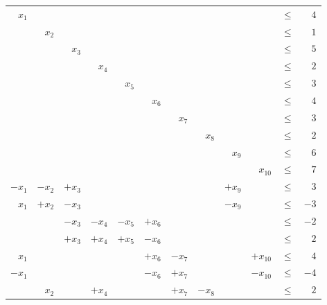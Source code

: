 \documentclass[11pt,a4paper,english]{article}
\begin{document}
\begin{table}[H]
   \begin{tabular}{rrrrrrrrrrrr}
   $x_1$  & ~      & ~      & ~      & ~      & ~      & ~      & ~      & ~      & ~         & $\leq$ & $4$  \\
   ~      & $x_2$  & ~      & ~      & ~      & ~      & ~      & ~      & ~      & ~         & $\leq$ & $1$  \\
   ~      & ~      & $x_3$  & ~      & ~      & ~      & ~      & ~      & ~      & ~         & $\leq$ & $5$  \\
   ~      & ~      & ~      & $x_4$  & ~      & ~      & ~      & ~      & ~      & ~         & $\leq$ & $2$  \\
   ~      & ~      & ~      & ~      & $x_5$  & ~      & ~      & ~      & ~      & ~         & $\leq$ & $3$  \\
   ~      & ~      & ~      & ~      & ~      & $x_6$  & ~      & ~      & ~      & ~         & $\leq$ & $4$  \\
   ~      & ~      & ~      & ~      & ~      & ~      & $x_7$  & ~      & ~      & ~         & $\leq$ & $3$  \\
   ~      & ~      & ~      & ~      & ~      & ~      & ~      & $x_8$  & ~      & ~         & $\leq$ & $2$  \\
   ~      & ~      & ~      & ~      & ~      & ~      & ~      & ~      & $x_9$  & ~         & $\leq$ & $6$  \\
   ~      & ~      & ~      & ~      & ~      & ~      & ~      & ~      & ~      & $x_{10}$  & $\leq$ & $7$  \\
   $-x_1$ & $-x_2$ & $+x_3$ & ~      & ~      & ~      & ~      & ~      & $+x_9$ & ~         & $\leq$ & $3$  \\
   $x_1$  & $+x_2$ & $-x_3$ & ~      & ~      & ~      & ~      & ~      & $-x_9$ & ~         & $\leq$ & $-3$ \\
   ~      & ~      & $-x_3$ & $-x_4$ & $-x_5$ & $+x_6$ & ~      & ~      & ~      & ~         & $\leq$ & $-2$ \\
   ~      & ~      & $+x_3$ & $+x_4$ & $+x_5$ & $-x_6$ & ~      & ~      & ~      & ~         & $\leq$ & $2$  \\
   $x_1$  & ~      & ~      & ~      & ~      & $+x_6$ & $-x_7$ & ~      & ~      & $+x_{10}$ & $\leq$ & $4$  \\
   $-x_1$ & ~      & ~      & ~      & ~      & $-x_6$ & $+x_7$ & ~      & ~      & $-x_{10}$ & $\leq$ & $-4$ \\
   ~      & $x_2$  & ~      & $+x_4$ & ~      & ~      & $+x_7$ & $-x_8$ & ~      & ~         & $\leq$ & $2$  \\

\end{tabular}
\end{table}
\end{document}

